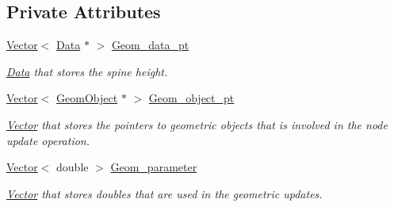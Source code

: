 \subsection*{Private Attributes}
\begin{DoxyCompactItemize}
\item 
\hyperlink{classoomph_1_1Vector}{Vector}$<$ \hyperlink{classoomph_1_1Data}{Data} $\ast$ $>$ \hyperlink{classoomph_1_1Spine_a50aea4fad1b1e0a3509a2405f3b31ecb}{Geom\+\_\+data\+\_\+pt}
\begin{DoxyCompactList}\small\item\em \hyperlink{classoomph_1_1Data}{Data} that stores the spine height. \end{DoxyCompactList}\item 
\hyperlink{classoomph_1_1Vector}{Vector}$<$ \hyperlink{classoomph_1_1GeomObject}{Geom\+Object} $\ast$ $>$ \hyperlink{classoomph_1_1Spine_aa5bf17dd0cd4f4acda73273a3227ef09}{Geom\+\_\+object\+\_\+pt}
\begin{DoxyCompactList}\small\item\em \hyperlink{classoomph_1_1Vector}{Vector} that stores the pointers to geometric objects that is involved in the node update operation. \end{DoxyCompactList}\item 
\hyperlink{classoomph_1_1Vector}{Vector}$<$ double $>$ \hyperlink{classoomph_1_1Spine_aa368ebf715af6b0c6da70ad68ed0ec91}{Geom\+\_\+parameter}
\begin{DoxyCompactList}\small\item\em \hyperlink{classoomph_1_1Vector}{Vector} that stores doubles that are used in the geometric updates. \end{DoxyCompactList}\end{DoxyCompactItemize}


